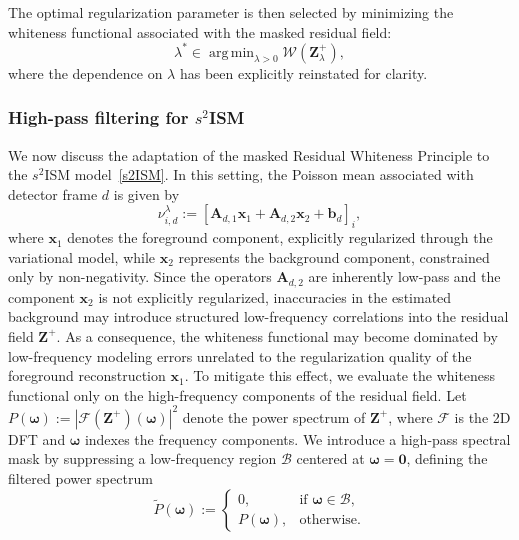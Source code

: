\documentclass[letterpaper]{article}
\DeclareMathOperator*{\argmin}{arg\,min}
\begin{document}
The optimal regularization parameter is then selected by minimizing the whiteness functional associated with the masked residual field:
\begin{equation}
    \lambda^*
    \in
    \argmin_{\lambda>0}
    \mathcal W(\mathbf Z^{+}_\lambda),
\end{equation}
where the dependence on $\lambda$ has been explicitly reinstated for clarity.

\subsubsection{High-pass filtering for $s^2$ISM} \label{sec:wp_highpass}

We now discuss the adaptation of the masked Residual Whiteness Principle to the $s^2$ISM model~\eqref{s2ISM}. In this setting, the Poisson mean associated with detector frame $d$ is given by
\begin{equation}
    \nu_{i,d}^\lambda
    :=
    \left[
    \mathbf A_{d,1}\mathbf x_1
    +
    \mathbf A_{d,2}\mathbf x_2
    +
    \mathbf b_d
    \right]_i,
\end{equation}
where $\mathbf x_1$ denotes the foreground component, explicitly regularized through the variational model, while $\mathbf x_2$ represents the background component, constrained only by non-negativity. Since the operators $\mathbf A_{d,2}$ are inherently low-pass and the component $\mathbf x_2$ is not explicitly regularized, inaccuracies in the estimated background may introduce structured low-frequency correlations into the residual field $\mathbf Z^+$. As a consequence, the whiteness functional may become dominated by low-frequency modeling errors unrelated to the regularization quality of the foreground reconstruction $\mathbf x_1$. To mitigate this effect, we evaluate the whiteness functional only on the high-frequency components of the residual field. Let
$
P(\boldsymbol\omega)
:=
|\mathcal F(\mathbf Z^+)(\boldsymbol\omega)|^2
$
denote the power spectrum of $\mathbf Z^+$, where $\mathcal F$ is the 2D DFT and $\boldsymbol\omega$ indexes the frequency components. We introduce a high-pass spectral mask by suppressing a low-frequency region
$
\mathcal B
$
centered at $\boldsymbol\omega=\mathbf 0$, defining the filtered power spectrum
\begin{equation}
    \widetilde P(\boldsymbol\omega)
    :=
    \begin{cases}
        0,
        & \text{if } \boldsymbol\omega\in\mathcal B,
        \\
        P(\boldsymbol\omega),
        & \text{otherwise.}
    \end{cases}
\end{equation}
\end{document}
